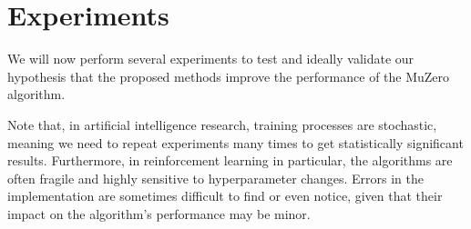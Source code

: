\section{Experiments}
We will now perform several experiments to test and ideally validate our hypothesis that the proposed methods improve the performance of the MuZero algorithm.

Note that, in artificial intelligence research, training processes are stochastic, meaning we need to repeat experiments many times to get statistically significant results. Furthermore, in reinforcement learning in particular, the algorithms are often fragile and highly sensitive to hyperparameter changes. Errors in the implementation are sometimes difficult to find or even notice, given that their impact on the algorithm's performance may be minor.





